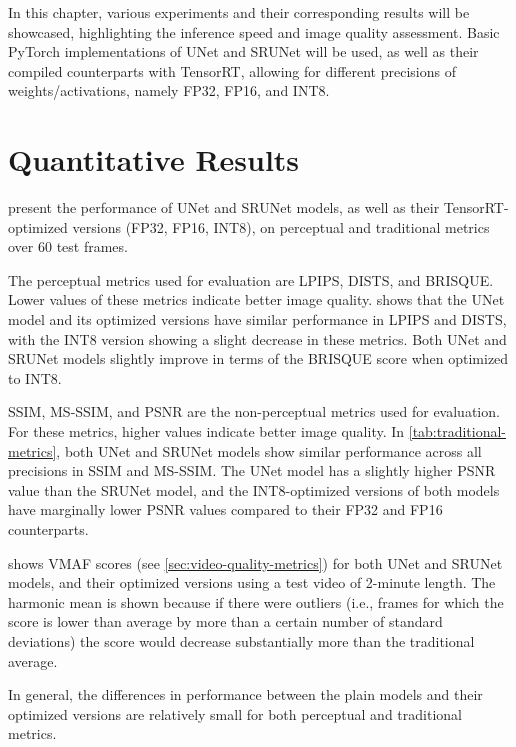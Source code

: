 \label{chap:Experiments}

In this chapter, various experiments and their corresponding results will be showcased, highlighting the inference speed and image quality assessment. Basic PyTorch implementations of UNet and SRUNet will be used, as well as their compiled counterparts with TensorRT, allowing for different precisions of weights/activations, namely FP32, FP16, and INT8.

\section{Quantitative Results}
\label{sec:quantitative-results}

 present the performance of UNet and SRUNet models, as well as their TensorRT-optimized versions (FP32, FP16, INT8), on perceptual and traditional metrics over 60 test frames.

The perceptual metrics used for evaluation are LPIPS, DISTS, and BRISQUE. Lower values of these metrics indicate better image quality.  shows that the UNet model and its optimized versions have similar performance in LPIPS and DISTS, with the INT8 version showing a slight decrease in these metrics. Both UNet and SRUNet models slightly improve in terms of the BRISQUE score when optimized to INT8.

SSIM, MS-SSIM, and PSNR are the non-perceptual metrics used for evaluation. For these metrics, higher values indicate better image quality. In \cref{tab:traditional-metrics}, both UNet and SRUNet models show similar performance across all precisions in SSIM and MS-SSIM. The UNet model has a slightly higher PSNR value than the SRUNet model, and the INT8-optimized versions of both models have marginally lower PSNR values compared to their FP32 and FP16 counterparts.

 shows VMAF scores (see \cref{sec:video-quality-metrics}) for both UNet and SRUNet models, and their optimized versions using a test video of 2-minute length. The harmonic mean is shown because if there were outliers (i.e., frames for which the score is lower than average by more than a certain number of standard deviations) the score would decrease substantially more than the traditional average.

In general, the differences in performance between the plain models and their optimized versions are relatively small for both perceptual and traditional metrics.

